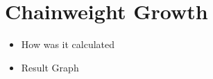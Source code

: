 
\newpage
\section{Chainweight Growth} \label{exp-chainweight}

\begin{itemize}
    \item How was it calculated
    \item Result Graph
\end{itemize}

